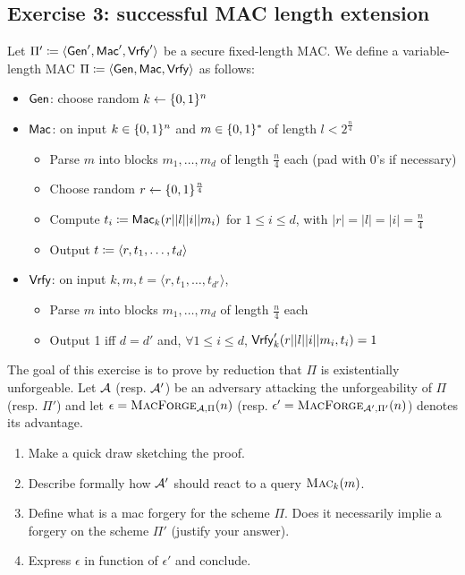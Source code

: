 \documentclass[12pt]{article}
\begin{document}
\subsection{Exercise 3: successful MAC length extension}

Let $\Pi' \coloneqq \langle\operatorname{\mathsf{Gen}}',\operatorname{\mathsf{Mac}}',\operatorname{\mathsf{Vrfy}}'\rangle$ be a secure fixed-length MAC. We define a variable-length MAC $\Pi \coloneqq \langle\operatorname{\mathsf{Gen}},\operatorname{\mathsf{Mac}},\operatorname{\mathsf{Vrfy}}\rangle$ as follows:

\begin{itemize}
	\item $\operatorname{\mathsf{Gen}}$: choose random $k \leftarrow \{0, 1\}^n$
	\item $\operatorname{\mathsf{Mac}}$: on input $k \in\{0, 1\}^n$ and $m \in \{0, 1\}^*$ of length $l<2^\frac n4$
	\begin{itemize}
		\item Parse $m$ into blocks $m_1,\dots,m_d$ of length $\frac n4$ each (pad with 0's if necessary)
		\item Choose random $r \leftarrow \{0, 1\}^\frac n4$
		\item Compute $t_i \coloneqq \operatorname{\mathsf{Mac}}_k(r||l||i||m_i)$ for $1\leq i\leq d$, with $|r|=|l|=|i|=\frac n4$
		\item Output $t \coloneqq \langle r,t_1,\dots,t_d\rangle$
	\end{itemize}
	\item $\operatorname{\mathsf{Vrfy}}$: on input $k, m, t=\langle r,t_1,\ldots,t_{d'}\rangle$,
	\begin{itemize}
		\item Parse $m$ into blocks $m_1,\ldots,m_d$ of length $\frac n4$ each
		\item Output 1 iff $d=d'$ and, $\forall 1\leq i\leq d$, $\operatorname{\mathsf{Vrfy}}'_k(r||l||i||m_i,t_i)=1$
	\end{itemize}
\end{itemize}

The goal of this exercise is to prove by reduction that $\Pi$ is existentially unforgeable. Let $\mathcal{A}$ (resp. $\mathcal{A}'$) be an adversary attacking the unforgeability of $\Pi$ (resp. $\Pi'$) and let $\epsilon = \textsc{MacForge}_{\mathcal{A},\Pi}(n)$ (resp. $\epsilon' = \textsc{MacForge}_{\mathcal{A}',\Pi'}(n)$) denotes its advantage.

\begin{enumerate}
	\item Make a quick draw sketching the proof.
	\item Describe formally how $\mathcal{A}'$ should react to a query $\textsc{Mac}_k(m)$.
	\item Define what is a mac forgery for the scheme $\Pi$. Does it necessarily implie a forgery on the scheme $\Pi'$ (justify your answer).
	\item Express $\epsilon$ in function of $\epsilon'$ and conclude.
\end{enumerate}
\end{document}
